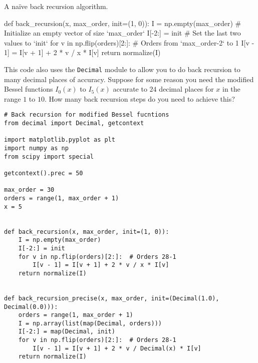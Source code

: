 \begin{listing}
    \centering
    \caption{A naïve back recursion algorithm.}
    \label{lst:back_recursion}
    \begin{pythoncode}
        def back_recursion(x, max_order, init=(1, 0)):
            I = np.empty(max_order)  # Initialize an empty vector of size `max_order`
            I[-2:] = init  # Set the last two values to `init`
            for v in np.flip(orders)[2:]:  # Orders from `max_order-2` to 1
                I[v - 1] = I[v + 1] + 2 * v / x * I[v]
            return normalize(I)
    \end{pythoncode}
\end{listing}

\Question This code also uses the \texttt{Decimal} module to allow you to do back recursion to many
decimal places of accuracy. Suppose for some reason you need the modified Bessel functions
$I_0(x)$ to $I_5(x)$ accurate to $24$ decimal places for $x$ in the range $1$ to $10$. How
many back recursion steps do you need to achieve this?

\begin{verbatim}
# Back recursion for modified Bessel fucntions
from decimal import Decimal, getcontext

import matplotlib.pyplot as plt
import numpy as np
from scipy import special

getcontext().prec = 50

max_order = 30
orders = range(1, max_order + 1)
x = 5


def back_recursion(x, max_order, init=(1, 0)):
    I = np.empty(max_order)
    I[-2:] = init
    for v in np.flip(orders)[2:]:  # Orders 28-1
        I[v - 1] = I[v + 1] + 2 * v / x * I[v]
    return normalize(I)


def back_recursion_precise(x, max_order, init=(Decimal(1.0), Decimal(0.0))):
    orders = range(1, max_order + 1)
    I = np.array(list(map(Decimal, orders)))
    I[-2:] = map(Decimal, init)
    for v in np.flip(orders)[2:]:  # Orders 28-1
        I[v - 1] = I[v + 1] + 2 * v / Decimal(x) * I[v]
    return normalize(I)
\end{verbatim}
